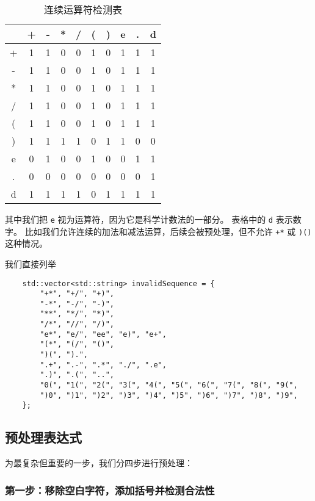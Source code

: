 \documentclass[UTF8]{ctexart}
\begin{document}
\begin{table}[H]
\centering
\begin{tabular}{c|c|c|c|c|c|c|c|c|c}
    & + & - & * & / & ( & ) & e & . & d \\
    \hline
    + & 1 & 1 & 0 & 0 & 1 & 0 & 1 & 1 & 1 \\
    - & 1 & 1 & 0 & 0 & 1 & 0 & 1 & 1 & 1 \\
    * & 1 & 1 & 0 & 0 & 1 & 0 & 1 & 1 & 1 \\
    / & 1 & 1 & 0 & 0 & 1 & 0 & 1 & 1 & 1 \\
    ( & 1 & 1 & 0 & 0 & 1 & 0 & 1 & 1 & 1 \\
    ) & 1 & 1 & 1 & 1 & 0 & 1 & 1 & 0 & 0 \\
    e & 0 & 1 & 0 & 0 & 1 & 0 & 0 & 1 & 1 \\
    . & 0 & 0 & 0 & 0 & 0 & 0 & 0 & 0 & 1 \\
    d & 1 & 1 & 1 & 1 & 0 & 1 & 1 & 1 & 1 \\
\end{tabular}
\caption{连续运算符检测表}
\end{table}

其中我们把 \texttt{e} 视为运算符，因为它是科学计数法的一部分。
表格中的 \texttt{d} 表示数字。
比如我们允许连续的加法和减法运算，后续会被预处理，但不允许 \texttt{+*} 或 \texttt{)()} 这种情况。

我们直接列举 
\begin{lstlisting}
    std::vector<std::string> invalidSequence = {
        "+*", "+/", "+)",
        "-*", "-/", "-)",
        "**", "*/", "*)",
        "/*", "//", "/)",
        "e*", "e/", "ee", "e)", "e+",
        "(*", "(/", "()",
        ")(", ").",
        ".+", ".-", ".*", "./", ".e",
        ".)", ".(", "..",
        "0(", "1(", "2(", "3(", "4(", "5(", "6(", "7(", "8(", "9(",
        ")0", ")1", ")2", ")3", ")4", ")5", ")6", ")7", ")8", ")9",
    };
\end{lstlisting}

\subsection{预处理表达式}

为最复杂但重要的一步，我们分四步进行预处理：

\subsubsection{第一步：移除空白字符，添加括号并检测合法性}
\end{document}
